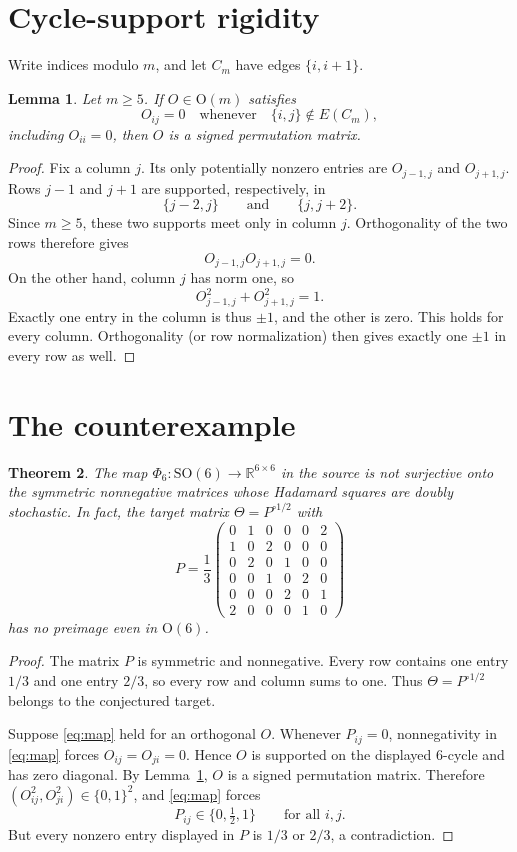\documentclass[11pt]{article}
\newtheorem{theorem}{Theorem}
\newtheorem{lemma}[theorem]{Lemma}
\newcommand{\SO}{\mathrm{SO}}
\newcommand{\OO}{\mathrm O}
\begin{document}
\section{Cycle-support rigidity}

Write indices modulo \(m\), and let \(C_m\) have edges
\(\{i,i+1\}\).

\begin{lemma}\label{lem:cycle}
Let \(m\ge5\). If \(O\in\OO(m)\) satisfies
\[
 O_{ij}=0
 \quad\text{whenever}\quad
 \{i,j\}\notin E(C_m),
\]
including \(O_{ii}=0\), then \(O\) is a signed permutation matrix.
\end{lemma}

\begin{proof}
Fix a column \(j\). Its only potentially nonzero entries are
\(O_{j-1,j}\) and \(O_{j+1,j}\). Rows \(j-1\) and \(j+1\) are supported,
respectively, in
\[
 \{j-2,j\}
 \qquad\text{and}\qquad
 \{j,j+2\}.
\]
Since \(m\ge5\), these two supports meet only in column \(j\).
Orthogonality of the two rows therefore gives
\[
 O_{j-1,j}O_{j+1,j}=0.
\]
On the other hand, column \(j\) has norm one, so
\[
 O_{j-1,j}^2+O_{j+1,j}^2=1.
\]
Exactly one entry in the column is thus \(\pm1\), and the other is zero.
This holds for every column. Orthogonality (or row normalization) then gives
exactly one \(\pm1\) in every row as well.
\end{proof}

\section{The counterexample}

\begin{theorem}\label{thm:main}
The map \(\Phi_6:\SO(6)\to\mathbb R^{6\times6}\) in the source is not
surjective onto the symmetric nonnegative matrices whose Hadamard squares
are doubly stochastic. In fact, the target matrix \(\Theta=P^{\circ1/2}\)
with
\[
P=\frac13
\begin{pmatrix}
0&1&0&0&0&2\\
1&0&2&0&0&0\\
0&2&0&1&0&0\\
0&0&1&0&2&0\\
0&0&0&2&0&1\\
2&0&0&0&1&0
\end{pmatrix}
\]
has no preimage even in \(\OO(6)\).
\end{theorem}

\begin{proof}
The matrix \(P\) is symmetric and nonnegative. Every row contains one entry
\(1/3\) and one entry \(2/3\), so every row and column sums to one. Thus
\(\Theta=P^{\circ1/2}\) belongs to the conjectured target.

Suppose \eqref{eq:map} held for an orthogonal \(O\). Whenever \(P_{ij}=0\),
nonnegativity in \eqref{eq:map} forces \(O_{ij}=O_{ji}=0\). Hence \(O\) is
supported on the displayed 6-cycle and has zero diagonal. By
Lemma~\ref{lem:cycle}, \(O\) is a signed permutation matrix. Therefore
\((O_{ij}^2,O_{ji}^2)\in\{0,1\}^2\), and \eqref{eq:map} forces
\[
 P_{ij}\in\{0,\tfrac12,1\}
 \qquad\text{for all }i,j.
\]
But every nonzero entry displayed in \(P\) is \(1/3\) or \(2/3\), a
contradiction.
\end{proof}
\end{document}
